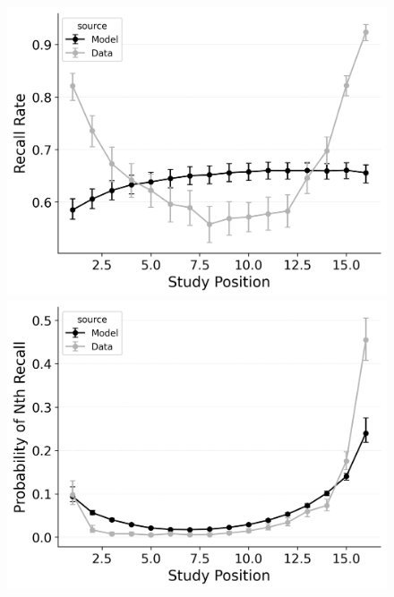 \documentclass[
  man,
  floatsintext,
  longtable,
  nolmodern,
  notxfonts,
  notimes,
  draftfirst,
  colorlinks=true,linkcolor=blue,citecolor=blue,urlcolor=blue]{apa7}
\begin{document}
\begin{figure}
%
\begin{minipage}{0.33\linewidth}
\includegraphics{figures/bw_HealeyKahana2014_BaseCRU_Fitting_spc.png}\end{minipage}%
\newline
\begin{minipage}{0.33\linewidth}
\includegraphics{figures/bw_HealeyKahana2014_CRU_with_Free_Start_Drift_rate_Fitting_pnr.png}\end{minipage}%
%
\begin{minipage}{0.33\linewidth}

\end{minipage}
\end{figure}
\end{document}
